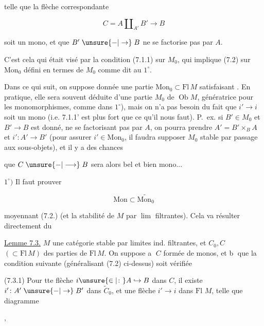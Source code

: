 telle que la flèche correspondante 

\[
C=A\amalg_{A'}B'\longrightarrow B
\]

soit un mono, et que $B'\mathrel{\unsure{-|\to}}B$ ne se factorise pas par $A$.

C'est cela qui était visé par la condition (7.1.1) sur $M_0$, qui implique (7.2) sur $\mathrm{Mon}_0$ défini en termes de $M_0$ comme dit au $1^\circ$.

Dans ce qui suit, on suppose donnée une partie $\mathrm{Mon}_0\subset\mathrm{Fl}\,M$ satisfaisant . En pratique, elle sera souvent déduite d'une partie $M_0$ de $\operatorname{Ob}M$, génératrice pour les monomorphismes, comme  dans $1^\circ$), mais on n'a pas besoin du fait que $i'\longrightarrow i$ soit un mono (i.e. 7.1.1' est plus fort que ce qu'il nous faut). P.~ex. si $B'\in M_0$ et $B'\longrightarrow B$ est donné, ne se factorisant pas par $A$, on pourra prendre $A'=B'\times_B A$ et $i'\colon A'\longrightarrow B'$ (pour assurer $i'\in\mathrm{Mon}_0$, il faudra  supposer $M_0$ stable par passage aux sous-objets), et il y a des chances


que $C\mathrel{\unsure{-|\longrightarrow}}B$ sera alors bel et bien mono...

$1^\circ)$ Il faut prouver

\[
\mathrm{Mon}\subset\widetilde{\mathrm{Mon}_0}
\]

moyennant (7.2.) (et la stabilité de $M$ par \uline{$\lim$} filtrantes). Cela va résulter directement du

\uline{Lemme 7.3.}  $M$ une catégorie stable par limites ind. filtrantes, et $C_0,C$ $(\subset\mathrm{Fl}\,M)$ des parties de $\mathrm{Fl}\,M$. On suppose \textcircled{a} $C$ formée de monos, et \textcircled{b} que la condition suivante (généralisant (7.2) ci-dessus) soit vérifiée

(7.3.1) Pour tte flèche $i\unsure{\in|\colon} A\hookrightarrow B$ dans $C$,  il existe $i'\colon A'\mathrel{\unsure{-|\to}}B'$ dans $\widetilde C_0$, et une flèche $i'\longrightarrow i$ dans \uline{$\mathrm{Fl}$} $M$, telle que   diagramme

\hfill,

